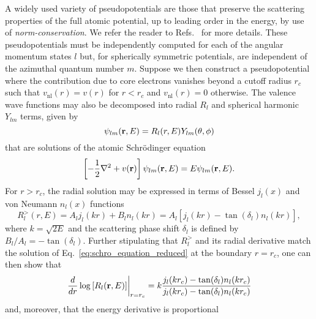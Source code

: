 A widely used variety of pseudopotentials 
are those that preserve the scattering properties 
of the full atomic potential, 
up to leading order in the energy, 
by use of 
{\it norm-conservation}.
%
We refer the reader to Refs.~\cite{PhysRevLett.43.1494,0022-3719-13-9-004,PhysRevB.40.2980,PhysRevB.41.1227} 
for more details.
%
These pseudopotentials 
must be independently computed for each of 
the angular momentum states $l$ but, 
for spherically symmetric potentials, 
are independent of 
the azimuthal quantum number $m$. 
%
Suppose we then construct a pseudopotential 
where the contribution due to core electrons 
vanishes beyond a cutoff radius $r_c$ 
{such that $v_\textrm{nl}(r)=v(r) $ 
for $r<r_c$ and $v_\textrm{nl}(r)=0$ 
otherwise.}
%
%
The valence wave functions may also be 
decomposed into radial $R_l$ and 
spherical harmonic $Y_{lm}$ terms, 
given by
%
\begin{equation}
\psi_{lm}({\bf r}, E)= R_l(r, E)Y_{lm}(\theta, \phi) 
\end{equation} 
that are solutions of 
the atomic Schr{\"o}dinger equation
%
\begin{equation}
\left[-\frac{1}{2}\nabla^2+v({\bf r})\right]\psi_{lm}({\bf r}, E)=E\psi_{lm}({\bf r}, E).
\label{eq:schro_equation_reduced}
\end{equation}
%
For $r>r_c$, 
the radial solution may be expressed 
in terms of  Bessel $j_l(x)$ 
and von Neumann $n_l(x)$ 
functions
%
\begin{equation}
R_l^{>}(r,E)=A_l j_l(kr)+B_l n_l(kr) = A_l[j_l(kr)-\tan(\delta_l)n_l(kr)], 
\end{equation}
%
where $k=\sqrt{2E}$ 
and the scattering phase shift $\delta_l$ 
is defined by  
$B_l/A_l=-\tan(\delta_l)$.
%
Further stipulating that $R_l^{>}$   
and its radial derivative 
match the solution of 
Eq.~\eqref{eq:schro_equation_reduced} 
at the boundary $r=r_c$,
one can then show that
%
\begin{equation}
\left.\frac{d}{dr}\log\left[R_l({\bf r}, E) \right]\right|_{r=r_c} 
= k\frac{j_l(kr_c)-\tan(\delta_l)n_l(kr_c)}{j_l(kr_c)-\tan(\delta_l)n_l(kr_c)}
\label{eq:norm_condition_1}
\end{equation}
%
and, moreover, that the energy derivative is proportional 
